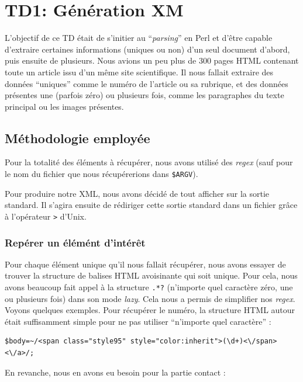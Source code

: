 \chapter{TD1: Génération XM}

L'objectif de ce TD était de s'initier au ``\textit{parsing}'' en Perl et d'être capable d'extraire certaines informations (uniques ou non) d'un seul document d'abord, puis ensuite de plusieurs. Nous avions un peu plus de 300 pages HTML contenant toute un article issu d'un même site scientifique. Il nous fallait extraire des données ``uniques'' comme le numéro de l'article ou sa rubrique, et des données présentes une (parfois zéro) ou plusieurs fois, comme les paragraphes du texte principal ou les images présentes.

\section{Méthodologie employée}

Pour la totalité des éléments à récupérer, nous avons utilisé des \textit{regex} (sauf pour le nom du fichier que nous récupérerions dans \lstinline{$ARGV}).

Pour produire notre XML, nous avons décidé de tout afficher sur la sortie standard. Il s'agira ensuite de rédiriger cette sortie standard dans un fichier grâce à l'opérateur \lstinline{>} d'Unix.

\subsection{Repérer un élémént d'intérêt}

Pour chaque élément unique qu'il nous fallait récupérer, nous avons essayer de trouver la structure de balises HTML avoisinante qui soit unique. Pour cela, nous avons beaucoup fait appel à la structure \lstinline{.*?} (n'importe quel caractère zéro, une ou plusieurs fois) dans son mode \textit{lazy}. Cela nous a permis de simplifier nos \textit{regex}.\\
Voyons quelques exemples. Pour récupérer le numéro, la structure HTML autour était suffisamment simple pour ne pas utiliser ``n'importe quel caractère'' :

\perl
\begin{lstlisting}
$body=~/<span class="style95" style="color:inherit">(\d+)<\/span><\/a>/;
\end{lstlisting}

En revanche, nous en avons eu besoin pour la partie contact :

